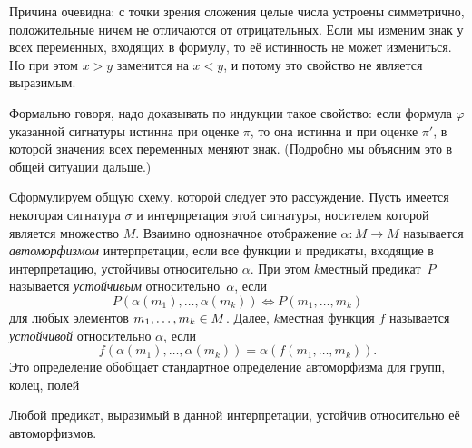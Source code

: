 Причина очевидна: с точки зрения сложения целые числа устроены
симметрично, положительные ничем не отличаются от отрицательных.
Если мы изменим знак у всех переменных, входящих в формулу, то
её истинность не может измениться. Но при этом $x>y$ заменится
на $x<y$, и потому это свойство не является выразимым.

Формально говоря, надо доказывать по индукции такое свойство:
если формула $\varphi$ указанной сигнатуры
истинна при оценке $\pi$, то она истинна и
при оценке $\pi'$, в которой значения всех переменных меняют
знак. (Подробно мы объясним это в общей ситуации дальше.)

Сформулируем общую схему, которой следует это рассуждение. Пусть
имеется некоторая сигнатура $\sigma$ и интерпретация этой
сигнатуры, носителем которой является множество $M$. Взаимно
однозначное отображение $\alpha\colon M\to M$ называется
\emph{автоморфизмом}%
%
интерпретации, если все функции и
предикаты, входящие в интерпретацию, устойчивы относительно
$\alpha$. При этом $k$\д местный предикат~$P$ называется
\emph{устойчивым}%
%
относительно~$\alpha$, если
        $$
P(\alpha(m_1),\dots,\alpha(m_k))
\Leftrightarrow
P(m_1,\dots, m_k)
        $$
для любых элементов
$m_1,\dots,m_k\hm\in M$. Далее, $k$\д местная
функция $f$ называется \emph{устойчивой}%
%
относительно $\alpha$, если
        $$
f(\alpha(m_1),\dots,\alpha(m_k))=
\alpha(f(m_1,\dots, m_k)).
        $$
Это определение обобщает стандартное определение
автоморфизма для групп, колец, полей 

\begin{theorem}
        \label{nondefinability-authomorphisms}
Любой предикат, выразимый в данной интерпретации,
устойчив относительно её автоморфизмов.
\end{theorem}


